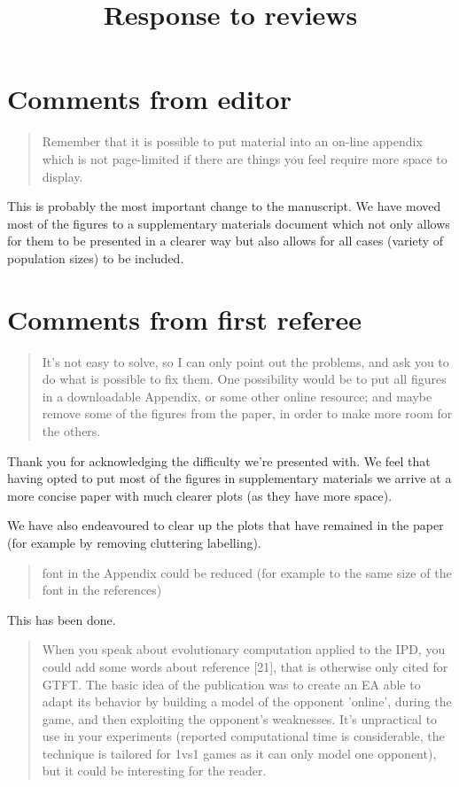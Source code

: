 \documentclass[a4]{article}
\title{Response to reviews}
\begin{document}
\maketitle

\section{Comments from editor}


\begin{quote}
    Remember that it is possible to put material into an on-line appendix which
    is not page-limited if there are things you feel require more space to
    display.
\end{quote}

This is probably the most important change to the manuscript. We have moved most
of the figures to a supplementary materials document which not only allows for
them to be presented in a clearer way but also allows for all cases (variety of
population sizes) to be included.

\section{Comments from first referee}

\begin{quote}
   It's not easy to solve, so I can only point out the problems, and ask you to
   do what is possible to fix them. One possibility would be to put all figures
   in a downloadable Appendix, or some other online resource; and maybe remove
   some of the figures from the paper, in order to make more room for the
   others.
\end{quote}

Thank you for acknowledging the difficulty we're presented with. We feel that
having opted to put most of the figures in supplementary materials we arrive at
a more concise paper with much clearer plots (as they have more space).

We have also endeavoured to clear up the plots that have remained in the paper
(for example by removing cluttering labelling).

\begin{quote}
    font in the Appendix could be reduced (for example to the same size of the
    font in the references)
\end{quote}

This has been done.

\begin{quote}
    When you speak about evolutionary computation applied to the IPD, you could
    add some words about reference [21], that is otherwise only cited for GTFT.
    The basic idea of the publication was to create an EA able to adapt its
    behavior by building a model of the opponent 'online', during the game, and
    then exploiting the opponent's weaknesses. It's unpractical to use in your
    experiments (reported computational time is considerable, the technique is
    tailored for 1vs1 games as it can only model one opponent), but it could be
    interesting for the reader.
\end{quote}
\end{document}
